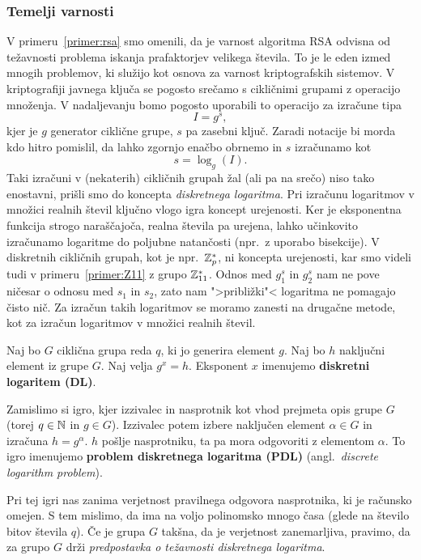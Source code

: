\subsubsection{Temelji varnosti}
V primeru~\ref{primer:rsa} smo omenili, da je varnost algoritma RSA odvisna od težavnosti problema
iskanja prafaktorjev velikega števila. To je le eden izmed mnogih problemov, ki služijo kot osnova
za varnost kriptografskih sistemov. V kriptografiji javnega ključa se pogosto srečamo s cikličnimi
grupami z operacijo množenja. V nadaljevanju bomo pogosto uporabili to operacijo za izračune tipa
$$
I = g^s,
$$
kjer je $g$ generator ciklične grupe, $s$ pa zasebni ključ. Zaradi notacije bi morda kdo hitro pomislil,
da lahko zgornjo enačbo obrnemo in $s$ izračunamo kot 
$$ 
s = \log_g(I).
$$
Taki izračuni v (nekaterih) cikličnih grupah žal (ali pa na srečo) niso tako enostavni, prišli smo do
koncepta \textit{diskretnega logaritma}. Pri izračunu logaritmov v množici realnih števil ključno
vlogo igra koncept urejenosti. Ker je eksponentna funkcija strogo naraščajoča, realna števila pa urejena,
lahko učinkovito izračunamo logaritme do poljubne natančosti (npr.\ z uporabo bisekcije). V diskretnih
cikličnih grupah, kot je npr.\ $\mathbb Z_p^*$, ni koncepta urejenosti, kar smo videli tudi v
primeru~\ref{primer:Z11} z grupo $\mathbb Z_{11}^*$. Odnos med $g^s_1$ in $g^s_2$ nam ne pove ničesar o
odnosu med $s_1$ in $s_2$, zato nam ">približki"< logaritma ne pomagajo čisto nič. Za izračun takih
logaritmov se moramo zanesti na drugačne metode, kot za izračun logaritmov v množici realnih števil.

\begin{definicija}
\label{def:dl}
    Naj bo $G$ ciklična grupa reda $q$, ki jo generira element $g$. Naj bo $h$ naključni element iz 
    grupe $G$. Naj velja $g^x = h$. Eksponent $x$ imenujemo \textbf{diskretni logaritem (DL)}.

    Zamislimo si igro, kjer izzivalec in nasprotnik kot vhod prejmeta opis grupe $G$ (torej $q \in \mathbb N$
    in $g \in G$). Izzivalec potem izbere naključen element $\alpha \in G$ in izračuna $h = g^{\alpha}$.
    $h$ pošlje nasprotniku, ta pa mora odgovoriti z elementom $\alpha$. To igro imenujemo 
    \textbf{problem diskretnega logaritma (PDL)} (angl.\ \textit{discrete logarithm problem}).

    Pri tej igri nas zanima verjetnost pravilnega odgovora nasprotnika, ki je računsko omejen. S tem
    mislimo, da ima na voljo polinomsko mnogo časa (glede na število bitov števila $q$). Če je grupa
    $G$ takšna, da je verjetnost zanemarljiva, pravimo, da za grupo $G$ drži \textit{predpostavka o
    težavnosti diskretnega logaritma}.
\end{definicija}

